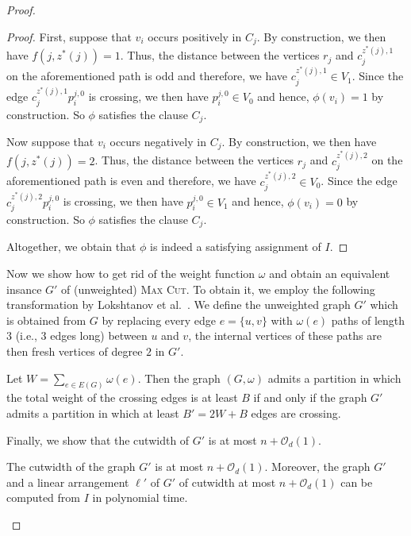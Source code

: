 \documentclass[a4paper,UKenglish,cleveref, autoref, thm-restate]{lipics-v2021}
\begin{document}
\begin{proof}
\begin{proof}
        First, suppose that $v_i$ occurs positively in $C_j$.
        By construction, we then have $f(j,z^*(j)) = 1$.
        Thus, the distance between the vertices $r_j$ and $c_j^{z^*(j), 1}$ on the aforementioned path is odd and therefore, we have $c_j^{z^*(j), 1} \in V_1$.
        Since the edge $c_j^{z^*(j), 1} p_i^{j,0}$ is crossing, we then have $p_i^{j,0} \in V_0$ and hence, $\phi(v_i) = 1$ by construction.
        So $\phi$ satisfies the clause $C_j$.

        Now suppose that $v_i$ occurs negatively in $C_j$.
        By construction, we then have $f(j,z^*(j)) = 2$.
        Thus, the distance between the vertices $r_j$ and $c_j^{z^*(j), 2}$ on the aforementioned path is even and therefore, we have $c_j^{z^*(j), 2} \in V_0$.
        Since the edge $c_j^{z^*(j), 2} p_i^{j,0}$ is crossing, we then have $p_i^{j,0} \in V_1$ and hence, $\phi(v_i) = 0$ by construction.
        So $\phi$ satisfies the clause $C_j$.

        Altogether, we obtain that $\phi$ is indeed a satisfying assignment of $I$. 
    \end{proof}

    Now we show how to get rid of the weight function $\omega$ and obtain an equivalent insance $G'$ of (unweighted) \textsc{Max Cut}.
    To obtain it, we employ the following transformation by Lokshtanov et al.~\cite{DBLP:journals/talg/LokshtanovMS18}.
    We define the unweighted graph $G'$ which is obtained from $G$ by replacing every edge $e = \{u, v\}$ with $\omega(e)$ paths of length $3$ (i.e., 3 edges long) between $u$ and $v$, the internal vertices of these paths are then fresh vertices of degree $2$ in $G'$.

    \begin{lemma}
        Let $W = \sum_{e \in E(G)} \omega(e)$.
        Then the graph $(G, \omega)$ admits a partition in which the total weight of the crossing edges is at least $B$ if and only if the graph $G'$ admits a partition in which at least $B' = 2W + B$ edges are crossing.
    \end{lemma}

    Finally, we show that the cutwidth of $G'$ is at most $n+\mathcal{O}_d(1)$.

    \begin{claim}
        The cutwidth of the graph $G'$ is at most $n+\mathcal{O}_d(1)$.
        Moreover, the graph $G'$ and a linear arrangement $\ell'$ of $G'$ of cutwidth at most $n+\mathcal{O}_d(1)$ can be computed from $I$ in polynomial time.
    \end{claim}


\end{proof}
\end{document}
